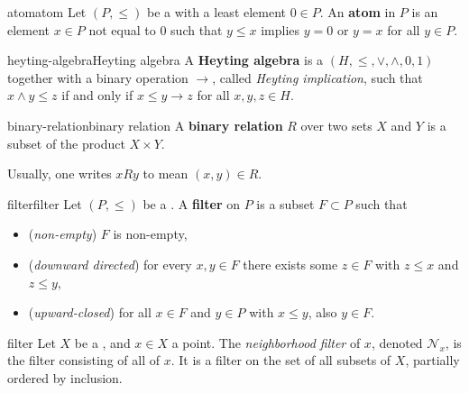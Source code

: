 \begin{topic}{atom}{atom}
    Let $(P, \le)$ be a  with a least element $0 \in P$. An \textbf{atom} in $P$ is an element $x \in P$ not equal to $0$ such that $y \le x$ implies $y = 0$ or $y = x$ for all $y \in P$.
\end{topic}

\begin{topic}{heyting-algebra}{Heyting algebra}
    A \textbf{Heyting algebra} is a  $(H, \le, \vee, \wedge, 0, 1)$ together with a binary operation $\rightarrow$, called \textit{Heyting implication}, such that $x \wedge y \le z$ if and only if $x \le y \rightarrow z$ for all $x, y, z \in H$.
\end{topic}

\begin{topic}{binary-relation}{binary relation}
    A \textbf{binary relation} $R$ over two sets $X$ and $Y$ is a subset of the product $X \times Y$.
    
    Usually, one writes $x R y$ to mean $(x, y) \in R$.
\end{topic}

\begin{topic}{filter}{filter}
    Let $(P, \le)$ be a . A \textbf{filter} on $P$ is a subset $F \subset P$ such that
    \begin{itemize}
        \item (\textit{non-empty}) $F$ is non-empty,
        \item (\textit{downward directed}) for every $x, y \in F$ there exists some $z \in F$ with $z \le x$ and $z \le y$,
        \item (\textit{upward-closed}) for all $x \in F$ and $y \in P$ with $x \le y$, also $y \in F$.
    \end{itemize}
\end{topic}

\begin{example}{filter}
    Let $X$ be a , and $x \in X$ a point. The \textit{neighborhood filter} of $x$, denoted $\mathcal{N}_x$, is the filter consisting of all  of $x$. It is a filter on the set of all subsets of $X$, partially ordered by inclusion.
\end{example}
